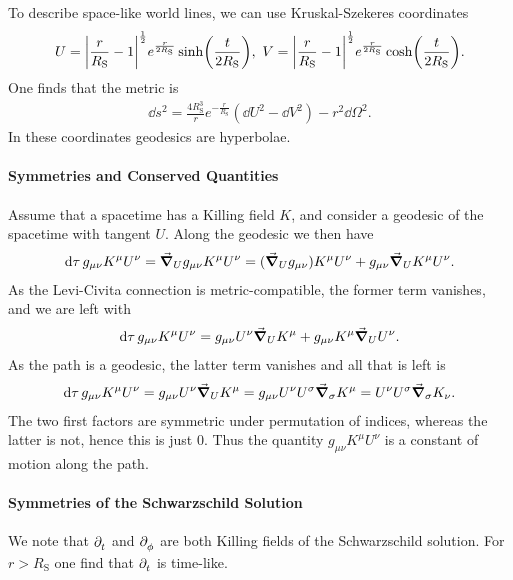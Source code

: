 To describe space-like world lines, we can use Kruskal-Szekeres coordinates
\begin{align*}
	U = \abs{\frac{r}{R_{\text{S}}} - 1}^{\frac{1}{2}}e^{\frac{r}{2R_{\text{S}}}}\sinh(\frac{t}{2R_{\text{S}}}),\ V = \abs{\frac{r}{R_{\text{S}}} - 1}^{\frac{1}{2}}e^{\frac{r}{2R_{\text{S}}}}\cosh(\frac{t}{2R_{\text{S}}}).
\end{align*}
One finds that the metric is
\begin{align*}
	\dd{s}^{2} = \frac{4R_{\text{S}}^{3}}{r}e^{-\frac{r}{R_{\text{S}}}}(\dd{U}^{2} - \dd{V}^{2}) - r^{2}\dd{\Omega}^{2}.
\end{align*}
In these coordinates geodesics are hyperbolae.

\paragraph{Symmetries and Conserved Quantities}
Assume that a spacetime has a Killing field $K$, and consider a geodesic of the spacetime with tangent $U$. Along the geodesic we then have
\begin{align*}
	\dd{\tau}g_{\mu\nu}K^{\mu}U^{\nu} = \grad_{U}{g_{\mu\nu}K^{\mu}U^{\nu}} = (\grad_{U}{g_{\mu\nu}})K^{\mu}U^{\nu} + g_{\mu\nu}\grad_{U}{K^{\mu}U^{\nu}}.
\end{align*}
As the Levi-Civita connection is metric-compatible, the former term vanishes, and we are left with
\begin{align*}
	\dd{\tau}g_{\mu\nu}K^{\mu}U^{\nu} = g_{\mu\nu}U^{\nu}\grad_{U}{K^{\mu}} + g_{\mu\nu}K^{\mu}\grad_{U}{U^{\nu}}.
\end{align*}
As the path is a geodesic, the latter term vanishes and all that is left is
\begin{align*}
	\dd{\tau}g_{\mu\nu}K^{\mu}U^{\nu} = g_{\mu\nu}U^{\nu}\grad_{U}{K^{\mu}} = g_{\mu\nu}U^{\nu}U^{\sigma}\grad_{\sigma}{K^{\mu}} = U^{\nu}U^{\sigma}\grad_{\sigma}{K_{\nu}}.
\end{align*}
The two first factors are symmetric under permutation of indices, whereas the latter is not, hence this is just $0$. Thus the quantity $g_{\mu\nu}K^{\mu}U^{\nu}$ is a constant of motion along the path.

\paragraph{Symmetries of the Schwarzschild Solution}
We note that $\partial^{}_{t}$ and $\partial^{}_{\phi}$ are both Killing fields of the Schwarzschild solution. For $r > R_{\text{S}}$ one find that $\partial^{}_{t}$ is time-like.

